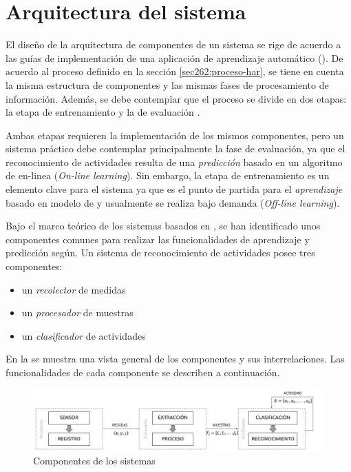 \section{Arquitectura del sistema}

\label{sec42:componentes}El diseño de la arquitectura de componentes
de un sistema  se rige de acuerdo a las guías de implementación
de una aplicación de aprendizaje automático (). De acuerdo
al proceso definido en la sección \ref{sec262:proceso-har}, se tiene
en cuenta la misma estructura de componentes y las mismas fases de
procesamiento de información. Además, se debe contemplar que el proceso
se divide en dos etapas: la etapa de entrenamiento y la de evaluación
\cite{LaraLabrador2013}. 

Ambas etapas requieren la implementación de los mismos componentes,
pero un sistema  práctico debe contemplar principalmente
la fase de evaluación, ya que el reconocimiento de actividades resulta
de una \emph{predicción} basado en un algoritmo de  en-linea
(\emph{On-line learning}). Sin embargo, la etapa de entrenamiento
es un elemento clave para el sistema ya que es el punto de partida
para el \emph{aprendizaje} basado en modelo de  y usualmente
se realiza bajo demanda (\emph{Off-line learning}).

Bajo el marco teórico de los sistemas  basados en ,
se han identificado unos componentes comunes para realizar las funcionalidades
de aprendizaje y predicción según\cite{Choudhury2008}. Un sistema
de reconocimiento de actividades posee tres componentes:
\begin{itemize}
\item un \emph{recolector }de medidas
\item un\emph{ procesador }de muestras 
\item un \emph{clasificador }de actividades
\end{itemize}
En la  se muestra una vista general
de los componentes y sus interrelaciones. Las funcionalidades de cada
componente se describen a continuación. 

\begin{figure}[!tbph]
\centering{}\includegraphics[width=1\linewidth]{capitulo-4/graphics/diagrama_4_1}\caption[Componentes de los sistemas HAR]{\label{fig42:componentes-har}Componentes de los sistemas }
\end{figure}


